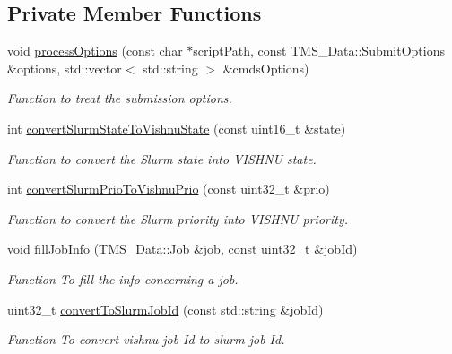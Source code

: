\subsection*{Private Member Functions}
\begin{DoxyCompactItemize}
\item 
void \hyperlink{classSlurmServer_afc45d1d7b21372d0eb47a8e2577aa861}{processOptions} (const char $\ast$scriptPath, const TMS\_\-Data::SubmitOptions \&options, std::vector$<$ std::string $>$ \&cmdsOptions)
\begin{DoxyCompactList}\small\item\em Function to treat the submission options. \item\end{DoxyCompactList}\item 
int \hyperlink{classSlurmServer_a294e9fcc0e094584645838773a5f454e}{convertSlurmStateToVishnuState} (const uint16\_\-t \&state)
\begin{DoxyCompactList}\small\item\em Function to convert the Slurm state into VISHNU state. \item\end{DoxyCompactList}\item 
int \hyperlink{classSlurmServer_a307212f4e936651b7c9f98c6878ff94c}{convertSlurmPrioToVishnuPrio} (const uint32\_\-t \&prio)
\begin{DoxyCompactList}\small\item\em Function to convert the Slurm priority into VISHNU priority. \item\end{DoxyCompactList}\item 
void \hyperlink{classSlurmServer_a0dbf7a58ec3a83676a09c4c74e858467}{fillJobInfo} (TMS\_\-Data::Job \&job, const uint32\_\-t \&jobId)
\begin{DoxyCompactList}\small\item\em Function To fill the info concerning a job. \item\end{DoxyCompactList}\item 
uint32\_\-t \hyperlink{classSlurmServer_a395cdd78cbe080d1834b403f3712402a}{convertToSlurmJobId} (const std::string \&jobId)
\begin{DoxyCompactList}\small\item\em Function To convert vishnu job Id to slurm job Id. \item\end{DoxyCompactList}\item 

\end{DoxyCompactItemize}
